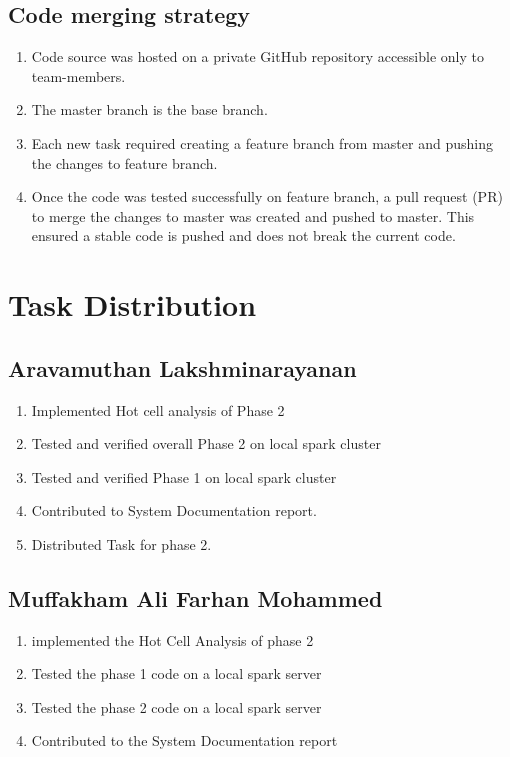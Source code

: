 \subsection{Code merging strategy}
\begin{enumerate}
    \item Code source was hosted on a private GitHub repository accessible only to team-members.
    \item The master branch is the base branch.
    \item Each new task required creating a feature branch from master and pushing the changes to feature branch.
    \item Once the code was tested successfully on feature branch, a pull request (PR) to merge the changes to master was created and pushed to master. This ensured a stable code is pushed and does not break the current code.
\end{enumerate}

\newpage

\section{Task Distribution}

\subsection{Aravamuthan Lakshminarayanan}
\begin{enumerate}
    \item Implemented Hot cell analysis of Phase 2
    \item Tested and verified overall Phase 2 on local spark cluster 
    \item Tested and verified Phase 1 on local spark cluster
    \item Contributed to System Documentation report.
    \item Distributed Task for phase 2.
\end{enumerate}

\subsection{Muffakham Ali Farhan Mohammed}
\begin{enumerate}
    \item implemented the Hot Cell Analysis of phase 2
    \item Tested the phase 1 code on a local spark server 
    \item Tested the phase 2 code on a local spark server 
    \item Contributed to the System Documentation report
\end{enumerate}

